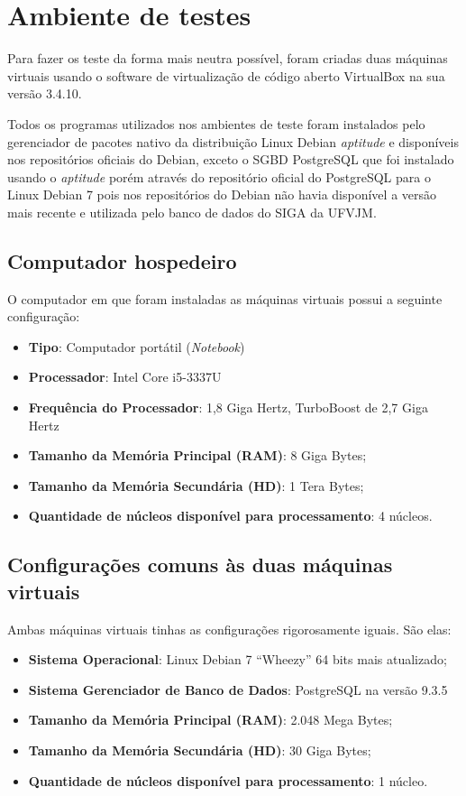 \section{Ambiente de testes}

Para fazer os teste da forma mais neutra possível, foram criadas duas máquinas 
virtuais usando o software de virtualização de código aberto VirtualBox na sua 
versão 3.4.10.

Todos os programas utilizados nos ambientes de teste foram instalados pelo 
gerenciador de pacotes nativo da distribuição Linux Debian \textit{aptitude} e 
disponíveis nos repositórios oficiais do Debian, exceto o SGBD PostgreSQL que 
foi instalado usando o \textit{aptitude} porém através do repositório oficial 
do PostgreSQL para o Linux Debian 7 pois nos repositórios do Debian não havia 
disponível a versão mais recente e utilizada pelo banco de dados do SIGA da 
UFVJM.

\subsection{Computador hospedeiro}
O computador em que foram instaladas as máquinas virtuais possui a seguinte 
configuração:
\begin{itemize}
	\item \textbf{Tipo}: Computador portátil (\textit{Notebook})
	\item \textbf{Processador}: Intel Core i5-3337U
	\item \textbf{Frequência do Processador}: 1,8 Giga Hertz, TurboBoost de 2,7 
	Giga Hertz
	\item \textbf{Tamanho da Memória Principal (RAM)}: 8 Giga Bytes;
	\item \textbf{Tamanho da Memória Secundária (HD)}: 1 Tera Bytes;
	\item \textbf{Quantidade de núcleos disponível para processamento}: 4 
	núcleos.
\end{itemize}

\subsection{Configurações comuns às duas máquinas virtuais}
 Ambas máquinas virtuais tinhas as configurações rigorosamente iguais. São elas:
\begin{itemize}
\item \textbf{Sistema Operacional}: Linux Debian 7 “Wheezy” 64 bits mais atualizado;
\item \textbf{Sistema Gerenciador de Banco de Dados}: PostgreSQL na versão 9.3.5
\item \textbf{Tamanho da Memória Principal (RAM)}: 2.048 Mega Bytes;
\item \textbf{Tamanho da Memória Secundária (HD)}: 30 Giga Bytes;
\item \textbf{Quantidade de núcleos disponível para processamento}: 1 núcleo.
\end{itemize}

